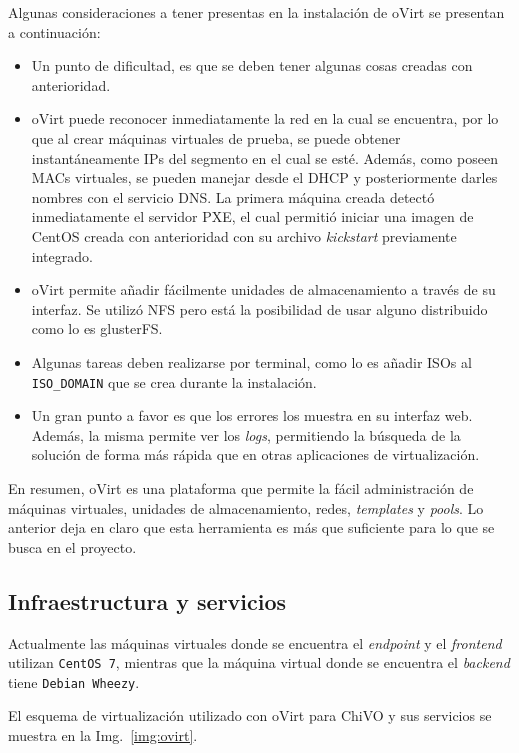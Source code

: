 Algunas consideraciones a tener presentas en la instalación de oVirt se presentan a continuación:

\begin{itemize}
	\item Un punto de dificultad, es que se deben tener algunas cosas creadas con anterioridad.
	\item oVirt puede reconocer inmediatamente la red en la cual se encuentra, por lo que al crear máquinas virtuales de prueba, se puede obtener instantáneamente IPs del segmento en el cual se est\'e. Además, como poseen MACs virtuales, se pueden manejar desde el DHCP y posteriormente darles nombres con el servicio DNS. La primera máquina creada detectó inmediatamente el servidor PXE, el cual permitió iniciar una imagen de CentOS creada con anterioridad con su archivo \emph{kickstart} previamente integrado.
	\item oVirt permite añadir fácilmente unidades de almacenamiento a trav\'es de su interfaz. Se utilizó NFS pero está la posibilidad de usar alguno distribuido como lo es glusterFS.
	\item Algunas tareas deben realizarse por terminal, como lo es añadir ISOs al \verb;ISO_DOMAIN; que se crea durante la instalación.
	\item Un gran punto a favor es que los errores los muestra en su interfaz web. Además, la misma permite ver los \emph{logs}, permitiendo la búsqueda de la solución de forma más rápida que en otras aplicaciones de virtualización.
\end{itemize}

En resumen, oVirt es una plataforma que permite la fácil administración de máquinas virtuales, unidades de almacenamiento, redes, \emph{templates} y \emph{pools}. Lo anterior deja en claro que esta herramienta es más que suficiente para lo que se busca en el proyecto.

\subsection*{Infraestructura y servicios}

Actualmente las máquinas virtuales donde se encuentra el \emph{endpoint} y el \emph{frontend} utilizan \verb;CentOS 7;, mientras que la máquina virtual donde se encuentra el \emph{backend} tiene \verb;Debian Wheezy;. 

El esquema de virtualización utilizado con oVirt para ChiVO y sus servicios se muestra en la Img.~\ref{img:ovirt}.


